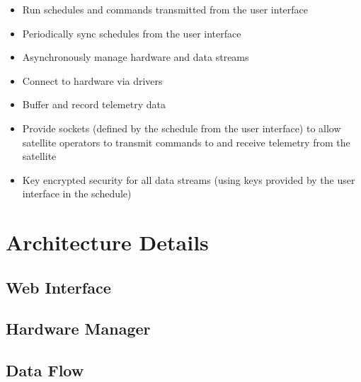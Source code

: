 \documentclass{mxl-design}
\begin{document}
\begin{itemize}
	\item Run schedules and commands transmitted from the user interface
	\item Periodically sync schedules from the user interface
	\item Asynchronously manage hardware and data streams
	\item Connect to hardware via drivers
	\item Buffer and record telemetry data
	\item Provide sockets (defined by the schedule from the user interface) to allow satellite operators to transmit commands to and receive telemetry from the satellite
	\item Key encrypted security for all data streams (using keys provided by the user interface in the schedule)
\end{itemize}

\section{Architecture Details}

\subsection{Web Interface}

\subsection{Hardware Manager}

\subsection{Data Flow}

\end{document}
